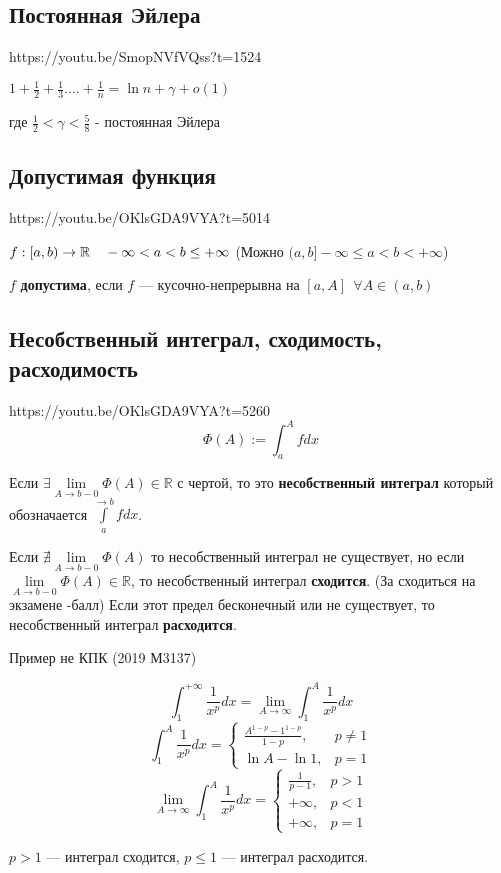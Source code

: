\documentclass[../main.tex]{subfiles}
\begin{document}
\subsection{Постоянная Эйлера}
https://youtu.be/SmopNVfVQss?t=1524

$1 + \frac{1}{2} + \frac{1}{3} .... + \frac{1}{n} = \ln{n} + \gamma + o(1)$

где $ \frac{1}{2} < \gamma < \frac{5}{8}$ - постоянная Эйлера


\subsection{Допустимая функция }
https://youtu.be/OKlsGDA9VYA?t=5014

$f : [a, b) \to \mathbb{R} \quad -\infty<a<b\leq+\infty$
(Можно $(a, b] -\infty\leq a<b<+\infty$)

$f$ \textbf{допустима}, если $f$ --- кусочно-непрерывна на $[a, A] \ \ \forall A\in (a, b)$


\subsection{Несобственный интеграл, сходимость, расходимость}
https://youtu.be/OKlsGDA9VYA?t=5260
    $$\Phi(A):=\int_a^A f dx$$

   Если  $ \exists\lim\limits_{A\to b-0} \Phi(A) \in \mathds{R}$ с чертой, то это \textbf{несобственный интеграл} который обозначается  $\int\limits_{a}^{\rightarrow b} fdx$.
          
    Если  $ \nexists\lim\limits_{A\to b-0} \Phi(A)$ то несобственный интеграл не существует, но если
    $\lim\limits_{A\to b-0} \Phi(A)\in \mathds{R}$,
    то несобственный интеграл \textbf{сходится}. (За сходиться на экзамене -балл)
     Если этот предел бесконечный или не существует, то несобственный интеграл \textbf{расходится}.
     
     
    Пример не КПК (2019 М3137)
    \begin{example}
    $$\int_1^{+\infty} \frac{1}{x^p} dx=\lim_{A\to\infty}\int_1^{A} \frac{1}{x^p} dx$$
    $$\int_1^{A} \frac{1}{x^p} dx=\begin{cases}
            \frac{A^{1-p}-1^{1-p}}{1-p}, & p\not=1 \\
            \ln A - \ln 1,               & p=1
        \end{cases}$$
    $$\lim_{A\to\infty}\int_1^{A} \frac{1}{x^p} dx=\begin{cases}
            \frac{1}{p-1}, & p>1 \\
            +\infty,       & p<1 \\
            +\infty,       & p=1
        \end{cases}$$

    $p>1$ --- интеграл сходится, $p\leq 1$ --- интеграл расходится.
\end{example}
\end{document}
